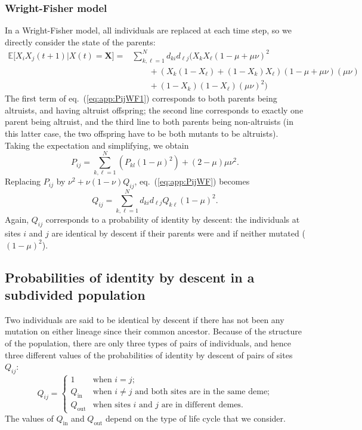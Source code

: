\documentclass[11pt, letterpaper]{article}
\renewcommand{\eqref}[1]{\textup{{\normalfont eq.~(\ref{#1}}\normalfont)}}
\newcommand{\Esp}[1]{\mathbb{E}\big[ #1\big]}%
\newcommand{\mutbias}{\nu}
\newcommand{\inn}{\textrm{in}}
\newcommand{\out}{\textrm{out}}
\newcommand{\Qin}{Q_{\inn}}
\newcommand{\Qout}{Q_{\out}}
\begin{document}
\subsubsection{Wright-Fisher model}

In a Wright-Fisher model, all individuals are replaced at each time step, so we directly consider the state of the parents:
\begin{align}\label{eq:app:PijWF1}
 \Esp{X_iX_j(t+1)|X(t)=\mathbf{X}} = & \sum_{k, \ell = 1}^N  d_{ki} d_{\ell j} \Bigg( X_k X_{\ell} (1-\mu+\mu \mutbias)^2 \nonumber\\ & \qquad + \left( X_k (1-X_{\ell}) + (1-X_k) X_{\ell} \right) (1-\mu+\mu \mutbias) (\mu \mutbias) \nonumber\\
 & \qquad + (1-X_k)(1-X_{\ell}) (\mu \mutbias)^2 \Bigg)
\end{align}
The first term of \eqref{eq:app:PijWF1} corresponds to both parents being altruists, and having altruist offspring; the second line corresponds to exactly one parent being altruist, and the third line to both parents being non-altruists (in this latter case, the two offspring have to be both mutants to be altruists). \\
Taking the expectation and simplifying, we obtain
\begin{equation}\label{eq:app:PijWF}
P_{ij} = \sum_{k, \ell = 1}^N \left( P_{kl} (1-\mu)^2  \right)+ (2-\mu)\mu \mutbias^2. 
\end{equation}
Replacing $P_{ij}$ by $\mutbias^2 + \mutbias (1-\mutbias) Q_{ij}$, \eqref{eq:app:PijWF} becomes
\begin{equation}\label{eq:app:QijWF}
Q_{ij} = \sum_{k, \ell=1}^N d_{ki} d_{\ell j} Q_{k\ell} (1-\mu)^2. 
\end{equation}
Again, $Q_{ij}$ corresponds to a probability of identity by descent: the individuals at sites $i$ and $j$ are identical by descent if their parents were and if neither mutated ($(1-\mu)^2$). 

\clearpage
\subsection{\label{sec:app:Qsubdiv}Probabilities of identity by descent in a subdivided population}
Two individuals are said to be identical by descent if there has not been any mutation on either lineage since their common ancestor. Because of the structure of the population, there are only three types of pairs of individuals, and hence three different values of the probabilities of identity by descent of pairs of sites $Q_{ij}$:
\begin{equation}
Q_{ij} = 
\begin{cases}
1 & \textrm{when $i=j$;}\\
%
\Qin & \textrm{when $i\neq j$ and both sites are in the same deme;}\\
%
\Qout & \textrm{when sites $i$ and $j$ are in different demes.}
\end{cases}
\end{equation}
The values of $\Qin$ and $\Qout$ depend on the type of life cycle that we consider. 
\end{document}
